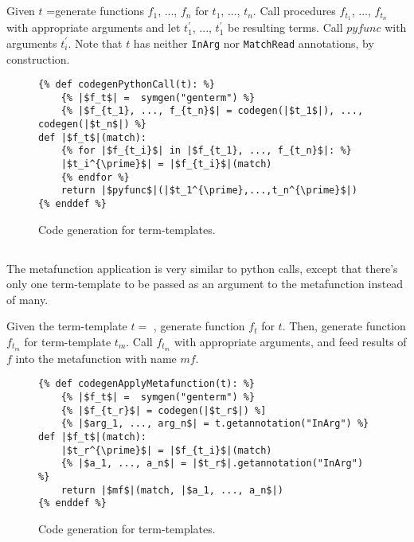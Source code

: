 \subsection{\PythonCallNoArg}
Given $t$ =\PythonCall generate functions $f_1$, ..., $f_n$ for $t_1$, ..., $t_n$. Call procedures $f_{t_1}$, ..., $f_{t_n}$ with appropriate arguments and let $t_1^{\prime}$, ..., $t_1^{\prime}$ be resulting terms. Call $pyfunc$ with arguments $t_i^{\prime}$. Note that $t$ has neither \texttt{InArg} nor \texttt{MatchRead} annotations, by construction.

\begin{figure}
\begin{verbatim}
{% def codegenPythonCall(t): %}
	{% |$f_t$| =  symgen("genterm") %}
	{% |$f_{t_1}, ..., f_{t_n}$| = codegen(|$t_1$|), ..., codegen(|$t_n$|) %}
def |$f_t$|(match):
	{% for |$f_{t_i}$| in |$f_{t_1}, ..., f_{t_n}$|: %}
	|$t_i^{\prime}$| = |$f_{t_i}$|(match)
	{% endfor %}
	return |$pyfunc$|(|$t_1^{\prime},...,t_n^{\prime}$|)
{% enddef %}
\end{verbatim}
\caption{Code generation for \PythonCallNoArg \space term-templates.}
\label{codegen-term-pycall}
\end{figure}


\subsection{\MetafunctionApplicationNoArgs}
The metafunction application is very similar to python calls, except that there's only one term-template to be passed as an argument to the metafunction instead of many.

Given the term-template $t=$ \ApplyMetafunction, generate function $f_t$ for $t$. Then, generate function $f_{t_m}$ for term-template $t_m$. Call $f_{t_m}$ with appropriate arguments, and feed results of $f$ into the metafunction with name $mf$.

\begin{figure}
\begin{verbatim}
{% def codegenApplyMetafunction(t): %}
	{% |$f_t$| =  symgen("genterm") %}
	{% |$f_{t_r}$| = codegen(|$t_r$|) %]
	{% |$arg_1, ..., arg_n$| = t.getannotation("InArg") %}
def |$f_t$|(match):
	|$t_r^{\prime}$| = |$f_{t_i}$|(match)
	{% |$a_1, ..., a_n$| = |$t_r$|.getannotation("InArg") %}
	return |$mf$|(match, |$a_1, ..., a_n$|)
{% enddef %}
\end{verbatim}
\caption{Code generation for \MetafunctionApplicationNoArgs \space term-templates.}
\label{codegen-term-mfapply}
\end{figure}

